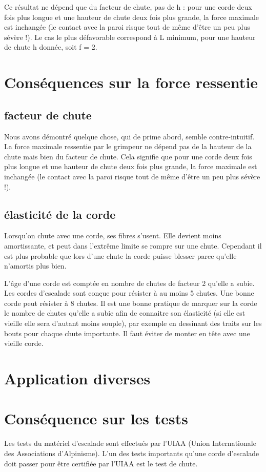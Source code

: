 \documentclass[a4paper,10pt,french]{scrartcl}
\begin{document}
Ce résultat ne dépend que du facteur de chute, pas de h : pour une corde deux fois plus longue et une hauteur de chute deux fois plus grande, la force maximale est inchangée (le contact
avec la paroi risque tout de même d’être un peu plus sévère !). Le cas le plus défavorable correspond à L minimum, pour une hauteur de chute h donnée, soit f = 2.
\section{Conséquences sur la force ressentie}
\subsection{facteur de chute}
Nous avons démontré quelque chose, qui de prime abord, semble contre-intuitif. La force maximale ressentie par le grimpeur ne dépend pas de la hauteur de la chute mais bien du facteur de chute. Cela signifie que pour une corde deux fois plus longue et une hauteur de chute deux
fois plus grande, la force maximale est inchangée (le contact
avec la paroi risque tout de même d’être un peu plus sévère !).
\subsection{élasticité de la corde}
Lorsqu'on chute avec une corde, ses fibres s'usent. Elle devient moins amortissante, et peut dans l'extr\^eme limite se rompre sur une chute. Cependant il est plus probable que lors d'une chute la corde puisse blesser parce qu'elle n'amortis plus bien.

L'\^age d'une corde est comptée en nombre de chutes de facteur 2 qu'elle a subie. Les cordes d'escalade sont conçue pour résister à au moins 5 chutes. Une bonne corde peut résister à 8 chutes.
Il est une bonne pratique de marquer sur la corde le nombre de chutes qu'elle a subie afin de connaitre son élasticité (si elle est vieille elle sera d'autant moins souple), par exemple en dessinant des traits sur les bouts pour chaque chute importante. Il faut éviter de monter en tête avec une vieille corde.
\section{Application diverses}
\section{Conséquence sur les tests}
Les tests du matériel d'escalade sont effectués par l'UIAA (Union Internationale des Associations d'Alpinisme). L'un des tests importants qu'une corde d'escalade doit passer pour être certifiée par l'UIAA est le test de chute.
\end{document}
